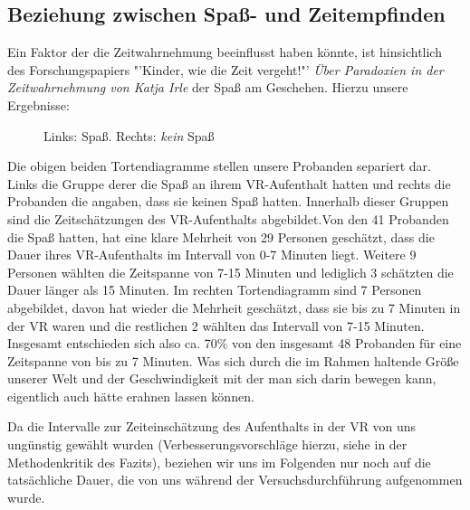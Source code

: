 \documentclass{Paper}
\begin{document}
\subsection{Beziehung zwischen Spaß- und Zeitempfinden}
\par
Ein Faktor der die Zeitwahrnehmung beeinflusst haben könnte, ist hinsichtlich des Forschungspapiers "'Kinder, wie die Zeit vergeht!"'
\textit{Über Paradoxien in der Zeitwahrnehmung von Katja Irle} \cite{Irle2017} der Spaß am Geschehen.
Hierzu unsere Ergebnisse:
	
\begin{figure}[H]
\caption{Links: Spaß. Rechts: \textit{kein} Spaß}
\label{Spass}
\end{figure} %

Die obigen beiden Tortendiagramme stellen unsere Probanden separiert dar. Links die Gruppe derer die Spaß an ihrem VR-Aufenthalt hatten und rechts die Probanden die angaben, dass sie keinen Spaß hatten. Innerhalb dieser Gruppen sind die Zeitschätzungen des VR-Aufenthalts abgebildet.Von den 41 Probanden die Spaß hatten, hat eine klare Mehrheit von 29 Personen geschätzt, dass die Dauer ihres VR-Aufenthalts im Intervall von 0-7 Minuten liegt. Weitere 9 Personen wählten die Zeitspanne von 7-15 Minuten und lediglich 3 schätzten die Dauer länger als 15 Minuten. Im rechten Tortendiagramm sind 7 Personen abgebildet, davon hat wieder die Mehrheit geschätzt, dass sie bis zu 7 Minuten in der VR waren und die restlichen 2 wählten das Intervall von 7-15 Minuten. Insgesamt entschieden sich also ca. 70\% von den insgesamt 48 Probanden für eine Zeitspanne von bis zu 7 Minuten. Was sich durch die im Rahmen haltende Größe unserer Welt und der Geschwindigkeit mit der man sich darin bewegen kann, eigentlich auch hätte erahnen lassen können.

\par
Da die Intervalle zur Zeiteinschätzung des Aufenthalts in der VR von uns ungünstig gewählt wurden (Verbesserungsvorschläge hierzu, siehe in der Methodenkritik des Fazits), beziehen wir uns im Folgenden nur noch auf die tatsächliche Dauer, die von uns während der Versuchsdurchführung aufgenommen wurde. 
\end{document}
